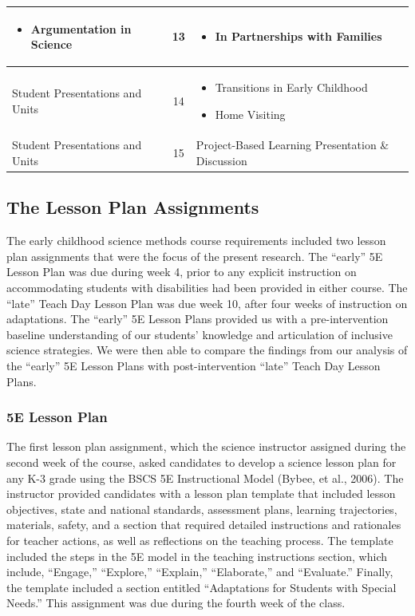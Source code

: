 \documentclass[11.5pt]{sig-alternate} %
\begin{document}
\begin{large}
\begin{table}[htbp]
\begin{tabular}{|l|c|l|}
\begin{itemize}[noitemsep, topsep=0pt]
    \item Argumentation in Science
\end{itemize} & 13 & \begin{itemize}[noitemsep, topsep=0pt]
    \item In Partnerships with Families
\end{itemize} \\ \hline
Student Presentations and Units & 14 & \begin{itemize}[noitemsep, topsep=0pt]
    \item Transitions in Early Childhood
    \item Home Visiting
\end{itemize} \\ \hline
Student Presentations and Units & 15 & Project-Based Learning Presentation \& Discussion \\ \hline
\end{tabular}
\end{table}

\subsection*{The Lesson Plan Assignments}

The early childhood science methods course requirements included two lesson plan assignments that were the focus of the present research.  The “early” 5E Lesson Plan was due during week 4, prior to any explicit instruction on accommodating students with disabilities had been provided in either course. The “late” Teach Day Lesson Plan was due week 10, after four weeks of instruction on adaptations.  The “early” 5E Lesson Plans provided us with a pre-intervention baseline understanding of our students’ knowledge and articulation of inclusive science strategies.  We were then able to compare the findings from our analysis of the “early” 5E Lesson Plans with post-intervention “late” Teach Day Lesson Plans.  

\subsubsection*{5E Lesson Plan}
The first lesson plan assignment, which the science instructor assigned during the second week of the course, asked candidates to develop a science lesson plan for any K-3 grade using the BSCS 5E Instructional Model (Bybee, et al., 2006).  The instructor provided candidates with a lesson plan template that included lesson objectives, state and national standards, assessment plans, learning trajectories, materials, safety, and a section that required detailed instructions and rationales for teacher actions, as well as reflections on the teaching process.  The template included the steps in the 5E model in the teaching instructions section, which include, “Engage,” “Explore,” “Explain,” “Elaborate,” and “Evaluate.”  Finally, the template included a section entitled “Adaptations for Students with Special Needs.” This assignment was due during the fourth week of the class.


\end{large}
\end{document}
